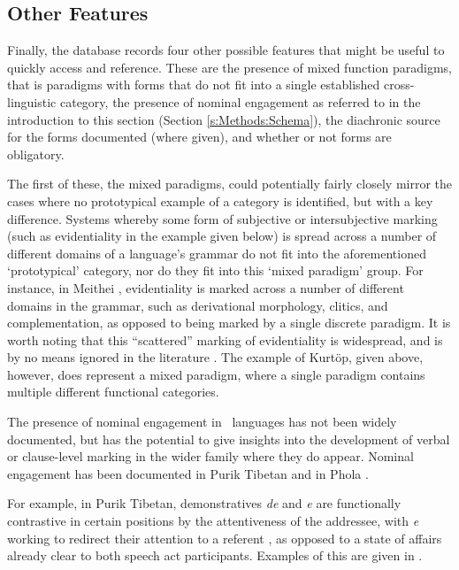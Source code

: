 \subsection{Other Features}\label{ss:Methods:Others}
Finally, the database records four other possible features that might be useful to quickly access and reference. These are the presence of mixed function paradigms, that is paradigms with forms that do not fit into a single established cross-linguistic category, the presence of nominal engagement as referred to in the introduction to this section (Section \ref{s:Methods:Schema}), the diachronic source for the forms documented (where given), and whether or not forms are obligatory.

The first of these, the mixed paradigms, could potentially fairly closely mirror the cases where no prototypical example of a category is identified, but with a key difference. Systems whereby some form of subjective or intersubjective marking (such as evidentiality in the example given below) is spread across a number of different domains of a language's grammar do not fit into the aforementioned `prototypical' category, nor do they fit into this `mixed paradigm' group. For instance, in Meithei \cite[295]{Chelliah1997}, evidentiality is marked across a number of different domains in the grammar, such as derivational morphology, clitics, and complementation, as opposed to being marked by a single discrete paradigm. It is worth noting that this ``scattered'' marking of evidentiality is widespread, and is by no means ignored in the literature \cite[23]{Aikhenvald2014}. The example of Kurtöp, given above, however, does represent a mixed paradigm, where a single paradigm contains multiple different functional categories.

The presence of nominal engagement in \lfam\ languages has not been widely documented, but has the potential to give insights into the development of verbal or clause-level marking in the wider family where they do appear. Nominal engagement has been documented in Purik Tibetan \cite[Tibetic: India:][]{Zemp2021} and in Phola \cite[Ngwi-Burmese, PRC:][]{GonzalezPerez2023}.

For example, in Purik Tibetan, demonstratives \textit{de} and \textit{e} are functionally contrastive in certain positions by the attentiveness of the addressee, with \textit{e} working to redirect their attention to a referent \cite{Zemp2021}, as opposed to a state of affairs already clear to both speech act participants. Examples of this are given in .

